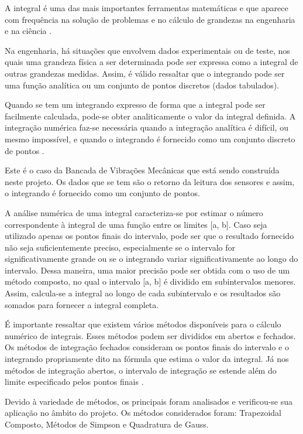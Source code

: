 
A integral é uma das mais importantes ferramentas matemáticas e que aparece com frequência na solução de problemas e no cálculo de grandezas 
na engenharia e na ciência \cite{metodos_numericos}.

Na engenharia, há situações que envolvem dados experimentais ou de teste, nos quais uma grandeza física a ser determinada pode ser expressa 
como a integral de outras grandezas medidas. Assim, é válido ressaltar que o integrando pode ser uma função analítica ou um conjunto de pontos
discretos (dados tabulados).

Quando se tem um integrando expresso de forma que a integral pode ser facilmente calculada, pode-se obter analiticamente o valor da integral 
definida. A integração numérica faz-se necessária quando a integração analítica é difícil, ou mesmo impossível, e quando o integrando é fornecido
como um conjunto discreto de pontos \cite{metodos_numericos}.

Este é o caso da Bancada de Vibrações Mecânicas que está sendo construída neste projeto. Os dados que se tem são o retorno da leitura dos sensores 
e assim, o integrando é fornecido como um conjunto de pontos.

A análise numérica de uma integral caracteriza-se por estimar o número correspondente à integral de uma função entre os limites [a, b]. 
Caso seja utilizado apenas os pontos finais do intervalo, pode ser que o resultado fornecido não seja suficientemente preciso, especialmente se
o intervalo for significativamente grande ou se o integrando variar significativamente ao longo do intervalo. Dessa maneira, uma maior precisão 
pode ser obtida com o uso de um método composto, no qual o intervalo [a, b] é dividido em subintervalos menores. Assim, calcula-se a integral ao
longo de cada subintervalo e os resultados são somados para fornecer a integral completa.

É importante ressaltar que existem vários métodos disponíveis para o cálculo numérico de integrais. Esses métodos podem ser divididos em abertos 
e fechados. Os métodos de integração fechados consideram os pontos finais do intervalo e o integrando propriamente dito na fórmula que estima o
valor da integral. Já nos métodos de integração abertos, o intervalo de integração se estende além do limite especificado pelos pontos finais 
\cite{metodos_numericos}.

Devido à variedade de métodos, os principais foram analisados e verificou-se sua aplicação no âmbito do projeto. Os métodos considerados foram: 
Trapezoidal Composto, Métodos de Simpson e Quadratura de Gauss.

